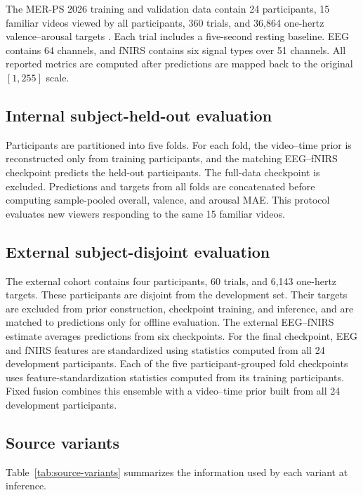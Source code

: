 The MER-PS 2026 training and validation data contain 24 participants, 15
familiar videos viewed by all participants, 360 trials, and 36,864 one-hertz
valence--arousal targets \cite{lian2026mer,merpsdataset}. Each trial includes a
five-second resting baseline. EEG contains 64 channels, and fNIRS contains six
signal types over 51 channels.
All reported metrics are computed after predictions are mapped back to the
original \([1,255]\) scale.

\subsection{Internal subject-held-out evaluation}

Participants are partitioned into five folds. For each fold, the video--time
prior is reconstructed only from training participants, and the matching
EEG--fNIRS checkpoint predicts the held-out participants. The full-data
checkpoint is excluded. Predictions and targets from all folds are concatenated
before computing sample-pooled overall, valence, and arousal MAE. This protocol
evaluates new viewers responding to the same 15 familiar videos.

\subsection{External subject-disjoint evaluation}

The external cohort contains four participants, 60 trials, and 6,143 one-hertz
targets. These participants are disjoint from the development set. Their targets
are excluded from prior construction, checkpoint training, and inference, and
are matched to predictions only for offline evaluation. The external EEG--fNIRS
estimate averages predictions from six checkpoints. For the final checkpoint,
EEG and fNIRS features are standardized using statistics computed from all 24
development participants. Each of the five participant-grouped fold checkpoints uses
feature-standardization statistics computed from its training participants.
Fixed fusion combines this ensemble with a video--time prior built from all 24
development participants.

\subsection{Source variants}

Table~\ref{tab:source-variants} summarizes the information used by each
variant at inference.

